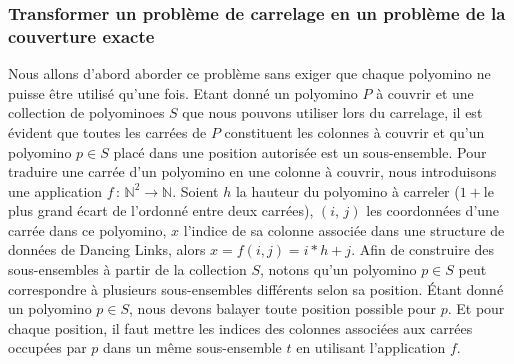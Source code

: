 \documentclass[a4paper,12pt]{article}
\begin{document}
\subsubsection{Transformer un problème de carrelage en un problème de la couverture exacte }
Nous allons d'abord aborder ce problème sans exiger que chaque polyomino ne puisse être utilisé qu'une fois. Etant donné un polyomino $P$ à couvrir et une collection de polyominoes $S$ que nous pouvons utiliser lors du carrelage, il est évident que  toutes les carrées de $P$ constituent les colonnes à couvrir et qu'un polyomino $p\in S$ placé dans une position autorisée est un sous-ensemble. Pour traduire une carrée d'un polyomino en une colonne à couvrir, nous introduisons une application $f\,:\,\mathbb{N}^2\rightarrow\mathbb{N}$. Soient $h$ la hauteur du polyomino à carreler ($1+$le plus grand écart de l'ordonné entre deux carrées), $(i,\,j)$ les coordonnées d'une carrée dans ce polyomino,  $x$ l'indice de sa colonne associée dans une structure de données de Dancing Links, alors $x=f(i,j)=i*h+j$. Afin de construire des sous-ensembles à partir de la collection $S$, notons qu'un polyomino $p\in S$ peut correspondre à plusieurs sous-ensembles différents selon sa position. Étant donné un polyomino $p\in S$, nous devons balayer toute position possible pour $p$. Et pour chaque position, il faut mettre les indices des colonnes associées aux carrées occupées par $p$ dans un même sous-ensemble $t$ en utilisant l'application $f$.  
\end{document}
